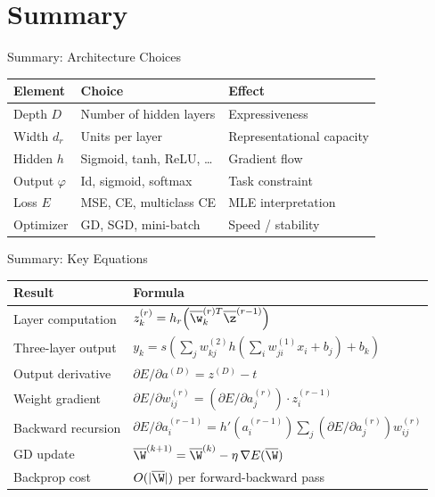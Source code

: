 \section{Summary}

\begin{frame}{Summary: Architecture Choices}
  \renewcommand{\arraystretch}{1.4}
  \begin{center}
  \begin{tabular}{lll}
    \toprule
    \textbf{Element} & \textbf{Choice} & \textbf{Effect} \\
    \midrule
    Depth $D$ & Number of hidden layers & Expressiveness \\
    Width $d_r$ & Units per layer & Representational capacity \\
    Hidden $h$ & Sigmoid, tanh, ReLU, \ldots & Gradient flow \\
    Output $\varphi$ & Id, sigmoid, softmax & Task constraint \\
    Loss $E$ & MSE, CE, multiclass CE & MLE interpretation \\
    Optimizer & GD, SGD, mini-batch & Speed / stability \\
    \bottomrule
  \end{tabular}
  \end{center}
\end{frame}

\begin{frame}{Summary: Key Equations}
  \renewcommand{\arraystretch}{1.6}
  \begin{center}
  \begin{tabular}{ll}
    \toprule
    \textbf{Result} & \textbf{Formula} \\
    \midrule
    Layer computation & $z_k^{(r)} = h_r\!\left(\overline{\w}_k^{(r)T}\overline{\z}^{(r-1)}\right)$ \\
    Three-layer output & $y_k = s\!\left(\sum_j w_{kj}^{(2)} h\!\left(\sum_i w_{ji}^{(1)} x_i + b_j\right) + b_k\right)$ \\
    Output derivative & $\partial E/\partial a^{(D)} = z^{(D)} - t$ \\
    Weight gradient & $\partial E/\partial w_{ij}^{(r)} = (\partial E/\partial a_j^{(r)})\cdot z_i^{(r-1)}$ \\
    Backward recursion & $\partial E/\partial a_i^{(r-1)} = h'(a_i^{(r-1)})\sum_j (\partial E/\partial a_j^{(r)}) w_{ij}^{(r)}$ \\
    GD update & $\overline{\W}^{(k+1)} = \overline{\W}^{(k)} - \eta\,\nabla E(\overline{\W})$ \\
    Backprop cost & $O(|\overline{\W}|)$ per forward-backward pass \\
    \bottomrule
  \end{tabular}
  \end{center}
\end{frame}

